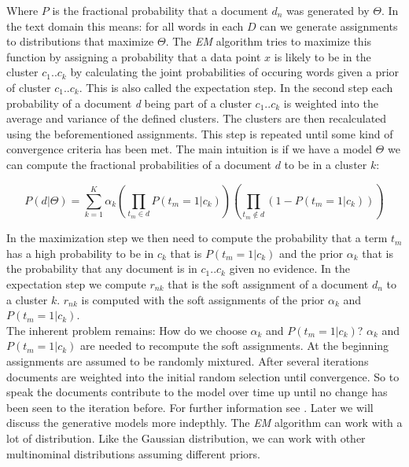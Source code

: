     Where $P$ is the fractional probability that a document $d_n$ was generated by $\Theta$. In the text domain this means: for all words in each $D$ can we generate assignments to distributions that maximize $\Theta$.
    The \emph{EM} algorithm tries to maximize this function by assigning a probability that a data point $x$ is likely to be in the cluster $c_1..c_k$ by calculating the joint probabilities of occuring words given a prior of cluster $c_1..c_k$. This is also called the expectation step. In the second step each probability of a document \emph{d} being part of a cluster $c_1..c_k$ is weighted into the average and variance of the defined clusters. The clusters are then recalculated using the beforementioned assignments. This step is repeated until some kind of convergence criteria has been met. The main intuition is if we have a model $\Theta$ we can compute the fractional probabilities of a document $d$ to be in a cluster $k$:

      \begin{equation}
        P(d|\Theta) = \sum_{k=1}^{K}\alpha_k\left ( \prod_{t_m \in d} P(t_m = 1|c_k) \right ) \left ( \prod_{t_m \not\in d} (1 - P(t_m = 1|c_k)) \right )
      \end{equation}

    In the maximization step we then need to compute the probability that a term $t_m$ has a high probability to be in $c_k$ that is $P(t_m = 1|c_k)$ and the prior $\alpha_k$ that is the probability that any document is in $c_1..c_k$ given no evidence. In the expectation step we compute $r_{nk}$ that is the soft assignment of a document $d_n$ to a cluster $k$. $r_{nk}$ is computed with the soft assignments of the prior $\alpha_k$ and $P(t_m = 1|c_k)$.\\
    The inherent problem remains: How do we choose $\alpha_k$ and $P(t_m = 1|c_k)$? $\alpha_k$ and $P(t_m = 1|c_k)$ are needed to recompute the soft assignments. At the beginning assignments are assumed to be randomly mixtured. After several iterations documents are weighted into the initial random selection until convergence. So to speak the documents contribute to the model over time up until no change has been seen to the iteration before. For further information see \cite{IRBookStanford2008}. Later we will discuss the generative models more indepthly. The \emph{EM} algorithm can work with a lot of distribution. Like the Gaussian distribution, we can work with other multinominal distributions assuming different priors.

